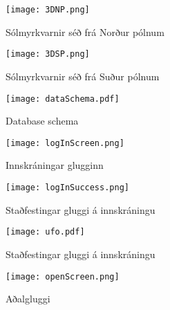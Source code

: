 \documentclass[12pt, git, final]{rureport}
\begin{document}
\begin{figure}
	\centering
	\texttt{[image: 3DNP.png]}
	\caption{Sólmyrkvarnir séð frá Norður pólnum}
	\label{fig:3DNP}
\end{figure}

\begin{figure}
	\centering
	\texttt{[image: 3DSP.png]}
	\caption{Sólmyrkvarnir séð frá Suður pólnum}
	\label{fig:3DSP}
\end{figure}

\begin{figure}
	\centering 
	\texttt{[image: dataSchema.pdf]}
	\caption{Database schema \label{fig:dataschema}}
\end{figure} 
%
\begin{figure}
	\centering 
	\texttt{[image: logInScreen.png]}
	\caption{Innskráningar glugginn \label{fig:logScreen}}
\end{figure} 

\begin{figure}
	\centering 
	\texttt{[image: logInSuccess.png]}
	\caption{Staðfestingar gluggi á innskráningu \label{fig:logsucces}}
\end{figure} 

\begin{figure}
	\centering 
	\texttt{[image: ufo.pdf]}
	\caption{Staðfestingar gluggi á innskráningu \label{fig:diagram}}
\end{figure}

\begin{figure}[t]
	\centering 
	\texttt{[image: openScreen.png]}
	\caption{Aðalgluggi \label{fig:openScreen}}
\end{figure} 

\clearpage

\printbibliography
\end{document}
